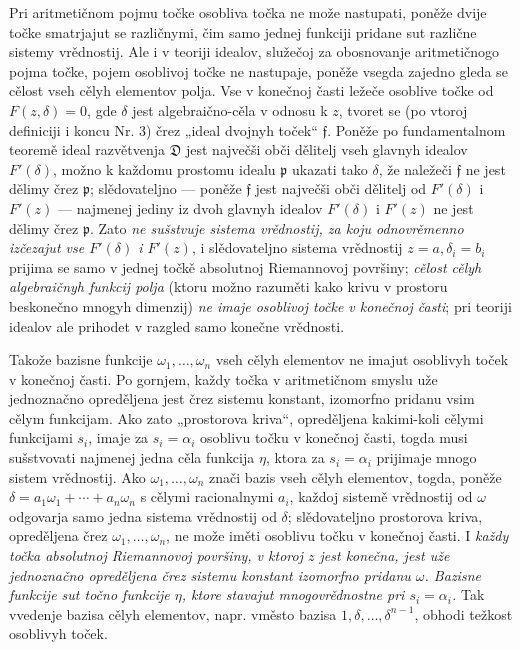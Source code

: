 \documentclass[11pt]{article}
\providecommand{\frD}{\mathfrak D}
\providecommand{\frf}{\mathfrak f}
\providecommand{\frp}{\mathfrak p}
\begin{document}
Pri aritmetičnom pojmu točke osobliva točka ne može nastupati, poněže dvije točke smatrjajut se različnymi, čim samo jednej funkciji pridane sut različne sistemy vrědnostij. Ale i v teoriji idealov, služečoj za obosnovanje aritmetičnogo pojma točke, pojem osoblivoj točke ne nastupaje, poněže vsegda zajedno gleda se cělost vseh cělyh elementov polja. Vse v konečnoj časti ležeče osoblive točke od \(F(z,\delta)=0\), gde \(\delta\) jest algebraično-cěla v odnosu k \(z\), tvoret se (po vtoroj definiciji i koncu Nr. 3) črez „ideal dvojnyh toček“ \(\frf\). Poněže po fundamentalnom teoremě ideal razvětvenja \(\frD\) jest največši obči dělitelj vseh glavnyh idealov \(F'(\delta)\), možno k každomu prostomu idealu \(\frp\) ukazati tako \(\delta\), že naležeči \(\frf\) ne jest dělimy črez \(\frp\); slědovateljno --- poněže \(\frf\) jest največši obči dělitelj od \(F'(\delta)\) i \(F'(z)\) --- najmenej jediny iz dvoh glavnyh idealov \(F'(\delta)\) i \(F'(z)\) ne jest dělimy črez \(\frp\). Zato {\itshape ne sušstvuje sistema vrědnostij, za koju odnovrěmenno izčezajut vse \(F'(\delta)\) i \(F'(z)\)}, i slědovateljno sistema vrědnostij \(z=a,\delta_i=b_i\) prijima se samo v jednej točkě absolutnoj Riemannovoj površiny; {\itshape cělost cělyh algebraičnyh funkcij polja} (ktoru možno razuměti kako krivu v prostoru beskonečno mnogyh dimenzij) {\itshape ne imaje osoblivoj točke v konečnoj časti}; pri teoriji idealov ale prihodet v razgled samo konečne vrědnosti.

Takože bazisne funkcije \(\omega_1,\ldots,\omega_n\) vseh cělyh elementov ne imajut osoblivyh toček v konečnoj časti. Po gornjem, každy točka v aritmetičnom smyslu uže jednoznačno opreděljena jest črez sistemu konstant, izomorfno pridanu vsim cělym funkcijam. Ako zato „prostorova kriva“, opreděljena kakimi-koli cělymi funkcijami \(s_i\), imaje za \(s_i=\alpha_i\) osoblivu točku v konečnoj časti, togda musi sušstvovati najmenej jedna cěla funkcija \(\eta\), ktora za \(s_i=\alpha_i\) prijimaje mnogo sistem vrědnostij. Ako \(\omega_1,\ldots,\omega_n\) znači bazis vseh cělyh elementov, togda, poněže \(\delta=a_1\omega_1+\cdots+a_n\omega_n\) s cělymi racionalnymi \(a_i\), každoj sistemě vrědnostij od \(\omega\) odgovarja samo jedna sistema vrědnostij od \(\delta\); slědovateljno prostorova kriva, opreděljena črez \(\omega_1,\ldots,\omega_n\), ne može iměti osoblivu točku v konečnoj časti. I {\itshape každy točka absolutnoj Riemannovoj površiny, v ktoroj \(z\) jest konečna, jest uže jednoznačno opreděljena črez sistemu konstant izomorfno pridanu \(\omega\). Bazisne funkcije sut točno funkcije \(\eta\), ktore stavajut mnogovrědnostne pri \(s_i=\alpha_i\).} Tak vvedenje bazisa cělyh elementov, napr. vměsto bazisa \(1,\delta,\ldots,\delta^{n-1}\), obhodi težkost osoblivyh toček.
\end{document}
